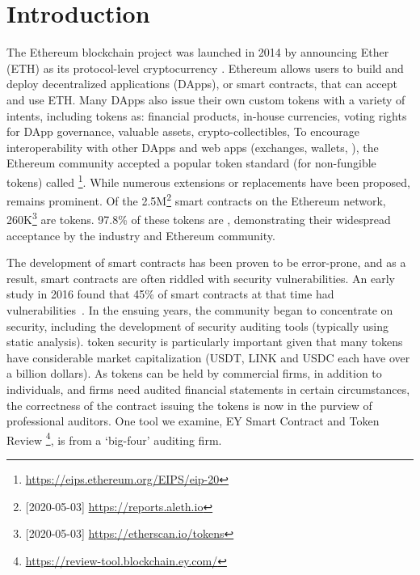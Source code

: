 
\section{Introduction}
\label{sect:introduction}

The Ethereum blockchain project was launched in 2014 by announcing Ether (ETH) as its protocol-level cryptocurrency \cite{EthGit,EIP150}. Ethereum allows users to build and deploy decentralized applications (DApps), or smart contracts, that can accept and use ETH. Many DApps also issue their own custom tokens with a variety of intents, including tokens as: financial products, in-house currencies, voting rights for DApp governance, valuable assets, crypto-collectibles, \etc To encourage interoperability with other DApps and web apps (exchanges, wallets, \etc), the Ethereum community accepted a popular token standard (for non-fungible tokens) called \erc\footnote{\url{https://eips.ethereum.org/EIPS/eip-20}}. While numerous \erc extensions or replacements have been proposed, \erc remains prominent. Of the 2.5M\footnote{[2020-05-03] \url{https://reports.aleth.io}} smart contracts on the Ethereum network, 260K\footnote{[2020-05-03] \url{https://etherscan.io/tokens}} are tokens. 97.8\% of these tokens are \erc\cite{EtherScan}, demonstrating their widespread acceptance by the industry and Ethereum community.

The development of smart contracts has been proven to be error-prone, and as a result, smart contracts are often riddled with security vulnerabilities. An early study in 2016 found that 45\% of smart contracts at that time had vulnerabilities~\cite{MakSm}. In the ensuing years, the community began to concentrate on security, including the development of security auditing tools (typically using static analysis). \erc token security is particularly important given that many tokens have considerable market capitalization (\eg USDT, LINK and USDC each have over a billion dollars). As tokens can be held by commercial firms, in addition to individuals, and firms need audited financial statements in certain circumstances, the correctness of the contract issuing the tokens is now in the purview of professional auditors. One tool we examine, EY Smart Contract and Token Review \footnote{\url{https://review-tool.blockchain.ey.com/}}, is from a `big-four' auditing firm. 

